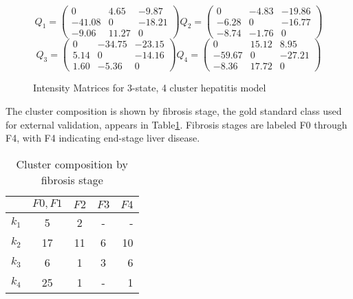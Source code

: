 

\begin{figure}
\[Q_1= \left( \begin{array}{ccc}
0 & 4.65 & -9.87 \\
-41.08 & 0 & -18.21 \\
-9.06 & 11.27 & 0
\end{array} \right)
%
Q_2= \left( \begin{array}{ccc}
0 & -4.83 & -19.86 \\
-6.28 & 0 & -16.77 \\
-8.74 & -1.76 & 0
\end{array} \right)
\]
\[ Q_3= \left( \begin{array}{ccc}
0 & -34.75 & -23.15 \\
5.14 & 0 & -14.16 \\
1.60 & -5.36 & 0
\end{array} \right)
%
Q_4= \left( \begin{array}{ccc}
0 & 15.12& 8.95 \\
-59.67 & 0 & -27.21 \\
-8.36 & 17.72 & 0
\end{array} \right)
\]
\caption{Intensity Matrices for 3-state, 4 cluster hepatitis model}
\label{fig:hepq}
\end{figure}

The cluster composition is shown by fibrosis stage, the gold standard class used for external validation, appears in Table\ref{hepassignments}.  Fibrosis stages are labeled F0 through F4, with F4 indicating end-stage liver disease.


\begin{table}[ht]
\caption{Cluster composition by fibrosis stage}
\label{hepassignments}
\vskip 0.15in
\begin{center}
\begin{tabular}{lcccr}
\hline
\hline
	& $F0,F1$ &$F2$	& $F3$	& $F4$ \\
\hline
\hline
$k_1$ & 5& 2& - & - \\
$k_2$ & 17& 11& 6& 10 \\
$k_3$ & 6& 1& 3& 6\\
$k_4$ & 25& 1& -& 1\\
		
\hline
\hline
\end{tabular}
\end{center}
\end{table}

